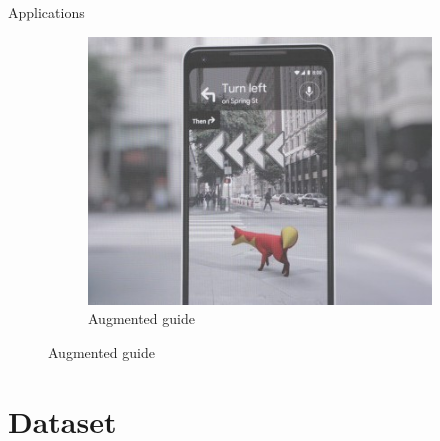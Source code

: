 \documentclass{beamer}
\begin{document}
\begin{frame}{Applications}
\begin{figure}
\begin{subfigure}{0.3\textwidth}
		\end{subfigure}
		\begin{subfigure}{0.3\textwidth}
			\centering
			\includegraphics[width=0.8\linewidth]{images/vr_dog}
			\captionsetup{justification=centering,margin=0.2cm}
			\caption{Augmented guide \cite{techcrunch}}
		\end{subfigure}
		\label{Fig:app}
	\end{figure}

\end{frame}

\section{Dataset}
\end{document}
